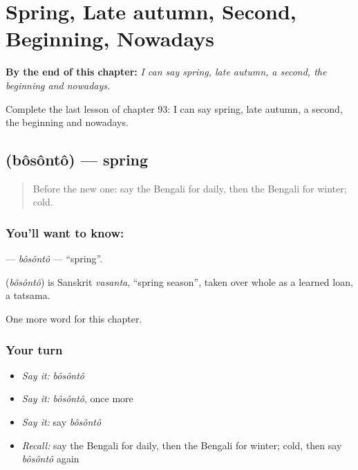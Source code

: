 
\chapter{Spring, Late autumn, Second, Beginning, Nowadays}
\label{ch:bn-spring-late-autumn-second-beginning-nowadays}

\begin{chapteropening}
\textbf{By the end of this chapter:} \emph{I can say spring, late autumn, a second, the beginning and nowadays.}

Complete the last lesson of chapter 93: I can say spring, late autumn, a second, the beginning and nowadays.
\end{chapteropening}

\section[\texorpdfstring{\bn{বসন্ত} (bôsôntô)}{বসন্ত (bôsôntô)}]{ (bôsôntô) — spring}

\label{lesson:BN-C93-bosonto}



\begin{quote}
Before the new one: say the Bengali for daily, then the Bengali for winter; cold.
\end{quote}

\subsection*{You'll want to know: }
\textbf{} — \emph{bôsôntô} — \textquotedblleft{}spring\textquotedblright{}.

\begin{cousinweb}
\textbf{} (\emph{bôsôntô}) is Sanskrit \emph{vasanta}, \textquotedblleft{}spring season\textquotedblright{}, taken over whole as a learned loan, a tatsama.
\end{cousinweb}

\begin{grammarlens}[title={What you've built}]
One more word for this chapter.
\end{grammarlens}

\subsection*{Your turn}
\begin{itemize}
\raggedright
  \item \emph{Say it:} \emph{bôsôntô}
  \item \emph{Say it:} \emph{bôsôntô}, once more
  \item \emph{Say it:} say \emph{bôsôntô}
  \item \emph{Recall:} say the Bengali for daily, then the Bengali for winter; cold, then say \emph{bôsôntô} again
\end{itemize}

